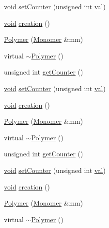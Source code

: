 \begin{DoxyCompactItemize}
\mbox{\hyperlink{glad_8h_a950fc91edb4504f62f1c577bf4727c29}{void}} \mbox{\hyperlink{class_polymer_a7ed6bbe09a570b59f9253d63fd3326d2}{set\+Counter}} (unsigned int \mbox{\hyperlink{glad_8h_a26942fd2ed566ef553eae82d2c109c8f}{val}})
\item 
\mbox{\hyperlink{glad_8h_a950fc91edb4504f62f1c577bf4727c29}{void}} \mbox{\hyperlink{class_polymer_a1daba3eb2ba8428bf2f3e814668b155f}{creation}} ()
\item 
\mbox{\hyperlink{class_polymer_ae77454a3908652e4df6a26b9cac509a5}{Polymer}} (\mbox{\hyperlink{class_monomer}{Monomer}} \&mm)
\item 
virtual \mbox{\hyperlink{class_polymer_aac2b3983f375a5691c7d5ca1a79594d5}{$\sim$\+Polymer}} ()
\item 
unsigned int \mbox{\hyperlink{class_polymer_a8346d821e5f8690d7816ba1d40036b69}{get\+Counter}} ()
\item 
\mbox{\hyperlink{glad_8h_a950fc91edb4504f62f1c577bf4727c29}{void}} \mbox{\hyperlink{class_polymer_a7ed6bbe09a570b59f9253d63fd3326d2}{set\+Counter}} (unsigned int \mbox{\hyperlink{glad_8h_a26942fd2ed566ef553eae82d2c109c8f}{val}})
\item 
\mbox{\hyperlink{glad_8h_a950fc91edb4504f62f1c577bf4727c29}{void}} \mbox{\hyperlink{class_polymer_a1daba3eb2ba8428bf2f3e814668b155f}{creation}} ()
\item 
\mbox{\hyperlink{class_polymer_ae77454a3908652e4df6a26b9cac509a5}{Polymer}} (\mbox{\hyperlink{class_monomer}{Monomer}} \&mm)
\item 
virtual \mbox{\hyperlink{class_polymer_aac2b3983f375a5691c7d5ca1a79594d5}{$\sim$\+Polymer}} ()
\item 
unsigned int \mbox{\hyperlink{class_polymer_a8346d821e5f8690d7816ba1d40036b69}{get\+Counter}} ()
\item 
\mbox{\hyperlink{glad_8h_a950fc91edb4504f62f1c577bf4727c29}{void}} \mbox{\hyperlink{class_polymer_a7ed6bbe09a570b59f9253d63fd3326d2}{set\+Counter}} (unsigned int \mbox{\hyperlink{glad_8h_a26942fd2ed566ef553eae82d2c109c8f}{val}})
\item 
\mbox{\hyperlink{glad_8h_a950fc91edb4504f62f1c577bf4727c29}{void}} \mbox{\hyperlink{class_polymer_a1daba3eb2ba8428bf2f3e814668b155f}{creation}} ()
\item 
\mbox{\hyperlink{class_polymer_ae77454a3908652e4df6a26b9cac509a5}{Polymer}} (\mbox{\hyperlink{class_monomer}{Monomer}} \&mm)
\item 
virtual \mbox{\hyperlink{class_polymer_aac2b3983f375a5691c7d5ca1a79594d5}{$\sim$\+Polymer}} ()
\item 

\end{DoxyCompactItemize}
